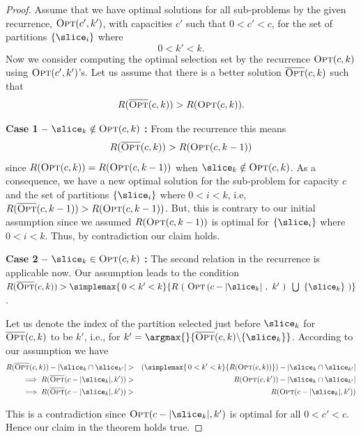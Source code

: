 \begin{proof}{}
Assume that we have optimal solutions for all sub-problems by the given recurrence, $\textsc{Opt}(c',k')$, with capacities $c'$ such that $0 < c' < c$, for the set of partitions $\{ \slice_{i} \}$ where $$0 < k' < k.$$ Now we consider computing the optimal selection set by the recurrence $\textsc{Opt}(c,k)$ using $\textsc{Opt}(c',k')$'s. Let us assume that there is a better solution $\overline{\textsc{Opt}}(c,k)$ such that 
$$R(\overline{\textsc{Opt}}(c,k)) > R(\textsc{Opt}(c,k)).$$

  {\bf Case 1 -- $\slice_k \notin \textsc{Opt}(c,k)$ :} From the recurrence this means $$R(\overline{\textsc{Opt}}(c,k)) > R(\textsc{Opt}(c,k-1))$$ since
  $R(\textsc{Opt}(c,k)) = R(\textsc{Opt}(c,k-1))$ when $\slice_k \notin \textsc{Opt}(c,k)$. As a consequence, we have a new
  optimal solution for the sub-problem for capacity $c$ and the set of
  partitions $\{ \slice_{i}\}$ where $0<i<k$, i.e, $R(\overline{\textsc{Opt}}(c,k-1)) > R(\textsc{Opt}(c,k-1))$. But, this is contrary to our initial assumption since we assumed $R(\textsc{Opt}(c,k-1))$ is optimal for $\{ \slice_{i}\}$ where $0<i<k$. Thus, by contradiction our claim holds.

  {\bf Case 2 -- $\slice_k \in \textsc{Opt}(c,k)$ :} The second relation in the recurrence is applicable now. Our assumption leads to the condition $R(\overline{\textsc{Opt}}(c,k)) >
  \simplemax{\,0 < k' < k}{  R\,\left(\,\,\textsc{Opt}\left(c-|\slice_{k}|\,\,,\,\,k'\,\,\right)\,\,
  \, \bigcup \,\,\,\{\slice_{k}\} \,\,\right)}$. 

  Let us denote the index of the partition selected just before $\slice_{k}$ for $\overline{\textsc{Opt}}(c,k)$ to be $k'$, i.e., for $k' = \argmax{}{\overline{\textsc{Opt}}(c,k) \backslash \{\slice_{k}\}}$. According to our assumption we have 
\begin{eqnarray*}
  R(\overline{\textsc{Opt}}(c,k)) - \left|\slice_{k} \cap \slice_{k'} \right| &>& \left(\simplemax{\,0 < k' < k}{R(\textsc{Opt}(c,k))} \right)- \left|\slice_{k} \cap \slice_{k'} \right|\\
  \implies R(\overline{\textsc{Opt}}(c-|\slice_{k}|,k')) &>& R(\textsc{Opt}(c,k')) - \left|\slice_{k} \cap \slice_{k'} \right|\\
  \implies R(\overline{\textsc{Opt}}(c-|\slice_{k}|,k')) &>& R(\textsc{Opt}(c-|\slice_{k}|,k'))
\end{eqnarray*}
  
This is a contradiction since $\textsc{Opt}(c-|\slice_{k}|,k')$ is optimal for all $0 < c' < c$. Hence our claim in the theorem holds true.
  \end{proof}

